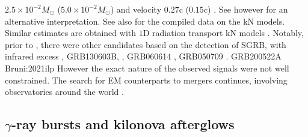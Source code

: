 $2.5\times10^{-2}M_{\odot}$ ($5.0\times10^{-2}M_{\odot}$) and velocity $0.27$c ($0.15$c)
\citep{Cowperthwaite:2017dyu,Villar:2017wcc}. 
See however \citep{Waxman:2017sqv} for an alternative interpretation.
See also \citep{Siegel:2019mlp} for the compiled data on the \ac{kN} models.
%
Similar estimates are obtained with $1$D radiation transport \ac{kN} models
\citep{Tanvir:2017pws,Tanaka:2017qxj}.
%
% 
Notably, prior to \AT{}, there were other candidates based on the detection of \ac{SGRB}, 
with infrared excess \eg, 
GRB130603B, \citep{Berger:2013wna,Tanvir:2013pia}, 
GRB060614 \citep{Jin:2015txa,Yang:2015pha}, 
GRB050709 \citep{Jin:2016pnm}.
GRB200522A \citep{WRONG}  Bruni:2021ilp
However the exact nature of the observed signals were not well constrained. 
%
The search for \ac{EM} counterparts to mergers continues, involving observatories around the world 
\citep{Law:2009,Singer:2014qca,Bellm:2014,Kasliwal:2016uhu}.
%




\subsection{$\gamma$-ray bursts and kilonova afterglows}

